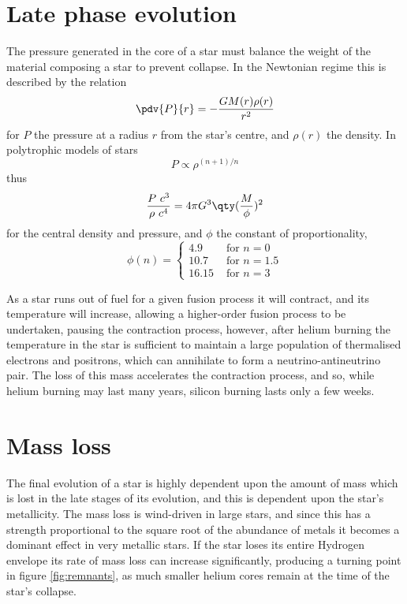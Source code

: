 \section{Late phase evolution}
\label{sec:late-phase-evolution}

The pressure generated in the core of a star must balance the weight
of the material composing a star to prevent collapse. In the Newtonian
regime this is described by the relation
\begin{equation}
  \label{eq:126}
  \pdv{P}{r} = - \frac{G M(r) \rho(r)}{r^2}
\end{equation}
for $P$ the pressure at a radius $r$ from the star's centre, and
$\rho(r)$ the density. In polytrophic models of stars
\[ P \propto \rho^{(n+1)/n} \]
thus
\begin{equation}
  \label{eq:127}
  \frac{P~c^3}{\rho~c^4} = 4 \pi G^3 \qty( \frac{M}{\phi} )^2
\end{equation}
for the central density and pressure, and $\phi$ the constant of
proportionality,
\begin{equation}
  \label{eq:128}
  \phi(n) =
  \begin{cases}
    4.9 & \text{ for } n=0 \\
10.7 & \text{ for } n= 1.5 \\
16.15 & \text{ for } n = 3 
  \end{cases}
\end{equation}

As a star runs out of fuel for a given fusion process it will
contract, and its temperature will increase, allowing a higher-order
fusion process to be undertaken, pausing the contraction process,
however, after helium burning the temperature in the star is
sufficient to maintain a large population of thermalised electrons and
positrons, which can annihilate to form a neutrino-antineutrino
pair. The loss of this mass accelerates the contraction process, and
so, while helium burning may last many years, silicon burning lasts
only a few weeks.

\section{Mass loss}
\label{sec:mass-loss}

The final evolution of a star is highly dependent upon the amount of
mass which is lost in the late stages of its evolution, and this is
dependent upon the star's metallicity. The mass loss is wind-driven in
large stars, and since this has a strength proportional to the square
root of the abundance of metals it becomes a dominant effect in very
metallic stars. If the star loses its entire Hydrogen envelope its
rate of mass loss can increase significantly, producing a turning
point in figure \ref{fig:remnants}, as much smaller helium cores
remain at the time of the star's collapse.


